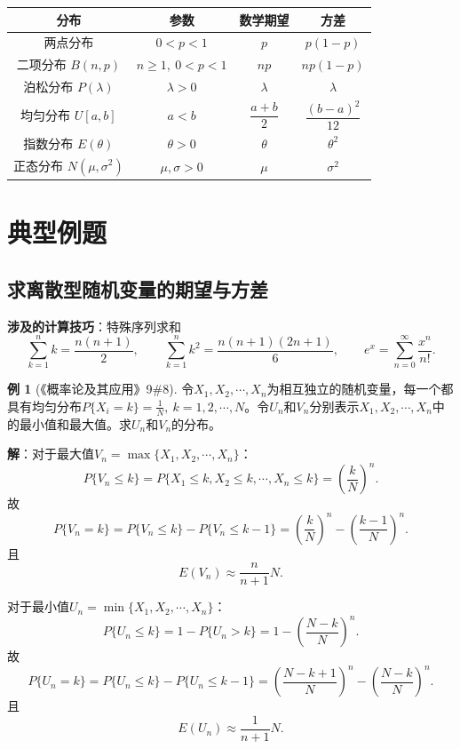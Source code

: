 \documentclass[11pt,a4paper]{report}
\theoremstyle{definition}
\newtheorem{example}{例}[chapter]
\theoremstyle{plain}
\begin{document}
\begin{center}
\begin{tabular}{c|c|c|c}
\hline
分布 & 参数 & 数学期望 & 方差 \\
\hline
两点分布 & $0<p<1$ & $p$ & $p(1-p)$ \\
\hline
二项分布 $B(n,p)$ & $n\geq 1,\ 0<p<1$ & $np$ & $np(1-p)$ \\
\hline
泊松分布 $P(\lambda)$ & $\lambda>0$ & $\lambda$ & $\lambda$ \\
\hline
均匀分布 $U[a,b]$ & $a<b$ & $\dfrac{a+b}{2}$ & $\dfrac{(b-a)^2}{12}$ \\
\hline
指数分布 $E(\theta)$ & $\theta>0$ & $\theta$ & $\theta^2$ \\
\hline
正态分布 $N(\mu,\sigma^2)$ & $\mu,\sigma>0$ & $\mu$ & $\sigma^2$ \\
\hline
\end{tabular}
\end{center}

\section{典型例题}

\subsection{求离散型随机变量的期望与方差}

\textbf{涉及的计算技巧}：特殊序列求和
\[
\sum_{k=1}^{n}k=\frac{n(n+1)}{2},\qquad
\sum_{k=1}^{n}k^2=\frac{n(n+1)(2n+1)}{6},\qquad
e^x=\sum_{n=0}^{\infty}\frac{x^n}{n!}.
\]

\begin{example}[《概率论及其应用》9\#8]
令$X_1,X_2,\cdots,X_n$为相互独立的随机变量，每一个都具有均匀分布$P\{X_i=k\}=\frac{1}{N},\ k=1,2,\cdots,N$。令$U_n$和$V_n$分别表示$X_1,X_2,\cdots,X_n$中的最小值和最大值。求$U_n$和$V_n$的分布。

\textbf{解}：对于最大值$V_n=\max\{X_1,X_2,\cdots,X_n\}$：
\[
P\{V_n\leq k\}=P\{X_1\leq k,X_2\leq k,\cdots,X_n\leq k\}=\left(\frac{k}{N}\right)^n.
\]
故
\[
P\{V_n=k\}=P\{V_n\leq k\}-P\{V_n\leq k-1\}=\left(\frac{k}{N}\right)^n-\left(\frac{k-1}{N}\right)^n.
\]
且
\[
E(V_n)\approx\frac{n}{n+1}N.
\]

对于最小值$U_n=\min\{X_1,X_2,\cdots,X_n\}$：
\[
P\{U_n\leq k\}=1-P\{U_n>k\}=1-\left(\frac{N-k}{N}\right)^n.
\]
故
\[
P\{U_n=k\}=P\{U_n\leq k\}-P\{U_n\leq k-1\}=\left(\frac{N-k+1}{N}\right)^n-\left(\frac{N-k}{N}\right)^n.
\]
且
\[
E(U_n)\approx\frac{1}{n+1}N.
\]
\end{example}
\end{document}
